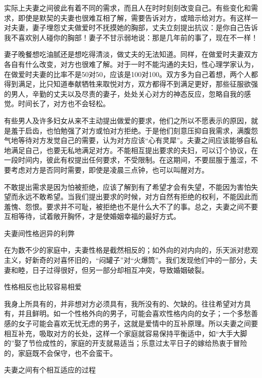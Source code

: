 \documentclass[12pt,UTF8]{ctexbook}
\begin{document}
实际上夫妻之间彼此有着不同的需求，而且人在时时刻刻改变自己。有些变化和需求，即使是默契的夫妻也很难互相了解，需要告诉对方，或暗示给对方。有这样一对夫妻，妻子埋怨丈夫做爱时不抚摸她的胸部，丈夫立刻提出抗议：是你自己告诉我不喜欢别人碰你的胸部！妻子不甘示弱地说：那是几年前的事了，现在不一样！

妻子晚餐想吃油腻还是想吃得清淡，做丈夫的无法知道。同样，在做爱时夫妻双方各自有什么改变，对方也很难了解。对于一时不能沟通的夫妇，性心理学家认为，在做爱时夫妻的比率不是50对50，应该是100对100。双方多为自己着想，两个人都得到满足，比只知道奉献牺牲来取悦对方，双方都得不到满足更好，那些征服欲强的男人，辛勤的丈夫以及尽责的妻子，处处关心对方的神态反应，忽略自我的感觉。时间长了，对方也不会轻松。

有些男人及许多妇女从来不主动提出做爱的要求，他们之所以不愿表示的原因，就是羞于启齿，也怕勉强了对方或怕对方拒绝。于是他们刻意压抑自我需求，满腹怨气地等待对方发觉自己的需要，认为对方应该“心有灵犀”。夫妻之间应该能够自私地满足自己，也要无私地满足对方。不能相互提出要求的夫妇，可以订个协议，在一段时间内，彼此有权提出任何要求，不受限制。在这期间，不要屈服于羞涩，不要考虑对方是否同时需要，即使是凌晨三点钟，也可以叫醒对方。

不敢提出需求是因为怕被拒绝，应该了解到有了希望才会有失望，不能因为害怕失望而永远不敢希望。当我们提出要求的时候，对方自然有拒绝的权利，不能因此而羞愧、怨恨。要求并不可耻，被拒绝也不是什么大不了的事。总之，夫妻之间不要互相等待，试着敞开胸怀，才是使婚姻幸福的最好方式。





夫妻间性格迥异的利弊


在为数不少的家庭中，夫妻性格是截然相反的；如外向的对内向的，乐天派对悲观主义，好新奇的对喜怀旧的，“闷罐子”对“火爆筒”。我们发现他们中的一部分，夫妻和睦，日子过得很好，但另一部分却相互冲突，导致婚姻破裂。





性格相反也比较容易相爱


我身上所具有的，并非想对方必须具有，我所没有的、欠缺的。往往希望对方具有，并且鲜明。如一个性格外向的男子，可能会喜欢性格内向的女子；一个多愁善感的女子可能会喜欢无忧无虑的男子，这就是爱情中的互补原理。所以夫妻之间要相互补充，吸取对方的长处，这样一个家庭就容易保持平衡适中，如“大手大脚的”娶了节俭成性的，家庭的开支就易适当；乐意过太平日子的嫁给热衷于冒险的，家庭既不会保守，也不会蛮干。





夫妻之间有个相互适应的过程
\end{document}
